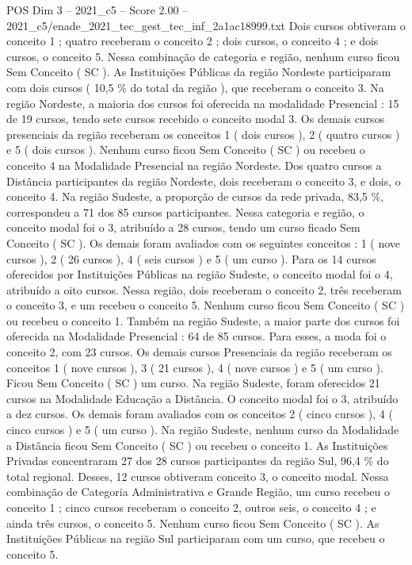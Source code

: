 \begin{textsample}{POS Dim 3 – 2021\_c5 – Score 2.00 – 2021\_c5/enade\_2021\_tec\_gest\_tec\_inf\_2a1ac18999.txt}
Dois cursos obtiveram o conceito 1 ; quatro receberam o conceito 2 ; dois cursos, o conceito 4 ; e dois cursos, o conceito 5.
Nessa combinação de categoria e região, nenhum curso ficou Sem Conceito ( SC ).
As Instituições Públicas da região Nordeste participaram com dois cursos ( 10,5 \% do total da região ), que receberam o conceito 3.
Na região Nordeste, a maioria dos cursos foi oferecida na modalidade Presencial : 15 de 19 cursos, tendo sete cursos recebido o conceito modal 3.
Os demais cursos presenciais da região receberam os conceitos 1 ( dois cursos ), 2 ( quatro cursos ) e 5 ( dois cursos ).
Nenhum curso ficou Sem Conceito ( SC ) ou recebeu o conceito 4 na Modalidade Presencial na região Nordeste.
Dos quatro cursos a Distância participantes da região Nordeste, dois receberam o conceito 3, e dois, o conceito 4.
Na região Sudeste, a proporção de cursos da rede privada, 83,5 \%, correspondeu a 71 dos 85 cursos participantes.
Nessa categoria e região, o conceito modal foi o 3, atribuído a 28 cursos, tendo um curso ficado Sem Conceito ( SC ).
Os demais foram avaliados com os seguintes conceitos : 1 ( nove cursos ), 2 ( 26 cursos ), 4 ( seis cursos ) e 5 ( um curso ).
Para os 14 cursos oferecidos por Instituições Públicas na região Sudeste, o conceito modal foi o 4, atribuído a oito cursos.
Nessa região, dois receberam o conceito 2, três receberam o conceito 3, e um recebeu o conceito 5.
Nenhum curso ficou Sem Conceito ( SC ) ou recebeu o conceito 1.
Também na região Sudeste, a maior parte dos cursos foi oferecida na Modalidade Presencial : 64 de 85 cursos.
Para esses, a moda foi o conceito 2, com 23 cursos.
Os demais cursos Presenciais da região receberam os conceitos 1 ( nove cursos ), 3 ( 21 cursos ), 4 ( nove cursos ) e 5 ( um curso ).
Ficou Sem Conceito ( SC ) um curso.
Na região Sudeste, foram oferecidos 21 cursos na Modalidade Educação a Distância.
O conceito modal foi o 3, atribuído a dez cursos.
Os demais foram avaliados com os conceitos 2 ( cinco cursos ), 4 ( cinco cursos ) e 5 ( um curso ).
Na região Sudeste, nenhum curso da Modalidade a Distância ficou Sem Conceito ( SC ) ou recebeu o conceito 1.
As Instituições Privadas concentraram 27 dos 28 cursos participantes da região Sul, 96,4 \% do total regional.
Desses, 12 cursos obtiveram conceito 3, o conceito modal.
Nessa combinação de Categoria Administrativa e Grande Região, um curso recebeu o conceito 1 ; cinco cursos receberam o conceito 2, outros seis, o conceito 4 ; e ainda três cursos, o conceito 5.
Nenhum curso ficou Sem Conceito ( SC ).
As Instituições Públicas na região Sul participaram com um curso, que recebeu o conceito 5.

\end{textsample}
